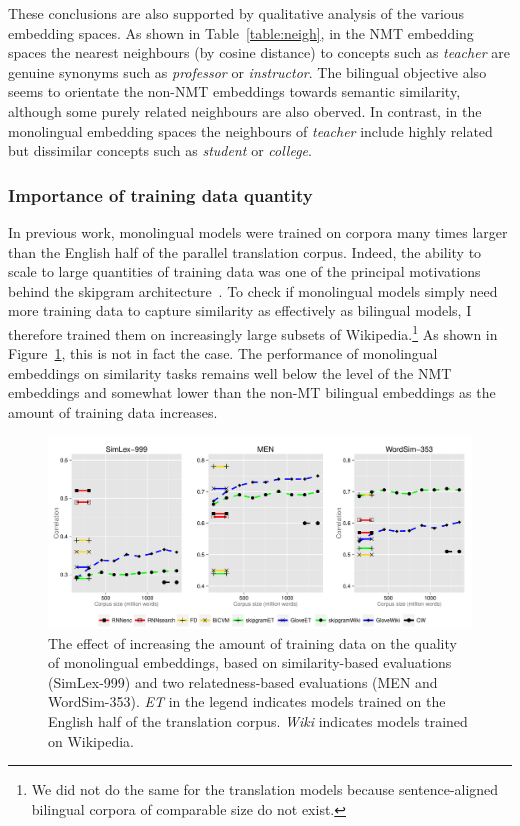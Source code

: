 These conclusions are also supported by qualitative analysis of the various embedding spaces. As shown in Table~\ref{table:neigh}, in the NMT embedding spaces the nearest neighbours (by cosine distance) to concepts such as \emph{teacher} are genuine synonyms such as \emph{professor} or \emph{instructor}. The bilingual objective also seems to orientate the non-NMT embeddings towards semantic similarity, although some purely related neighbours are also oberved. In contrast, in the monolingual embedding spaces the neighbours of \emph{teacher} include  highly related but dissimilar concepts such as \emph{student} or \emph{college}. 

 
\subsubsection{Importance of training data quantity}

In previous work, monolingual models were trained on corpora many times larger than the English half of the parallel translation corpus. Indeed, the ability to scale to large quantities of training data was one of the principal motivations behind the skipgram architecture~\citep{mikolov2013distributed}. To check if monolingual models simply need more training data to capture similarity as effectively as bilingual models, I therefore trained them on increasingly large subsets of Wikipedia.\footnote{We did not do the same for the translation models because sentence-aligned bilingual corpora of comparable size do not exist.} As shown in Figure~\ref{fig:size}, this is not in fact the case. The performance of monolingual embeddings on similarity tasks remains well below the level of the NMT embeddings and somewhat lower than the non-MT bilingual embeddings as the amount of training data increases. 

\begin{figure}[h]
\includegraphics[width = \textwidth,clip=True,trim=0 10 0 10]{Chapter_3/Figure_1_ICLR2015}
\vspace{-4mm}
\caption{The effect of increasing the amount of training data on the quality of monolingual embeddings, based on similarity-based evaluations (SimLex-999) and two relatedness-based evaluations (MEN and WordSim-353). \emph{ET} in the legend indicates models trained on the English half of the translation corpus. \emph{Wiki} indicates models trained on Wikipedia.}
\label{fig:size}
\end{figure}


